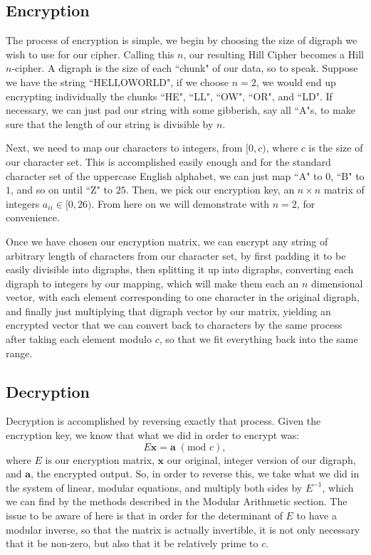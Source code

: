 \documentclass{article}
\begin{document}
\subsection{Encryption}
The process of encryption is simple, we begin by choosing the size of digraph we wish to use for our cipher. Calling this $n$, our resulting Hill Cipher becomes a Hill $n$-cipher. A digraph is the size of each ``chunk" of our data, so to speak. Suppose we have the string ``HELLOWORLD", if we choose $n = 2$, we would end up encrypting individually the chunks ``HE", ``LL", ``OW", ``OR", and ``LD". If necessary, we can just pad our string with some gibberish, say all ``A"s, to make sure that the length of our string is divisible by $n$. \medskip

\noindent Next, we need to map our characters to integers, from $[0, c)$, where $c$ is the size of our character set. This is accomplished easily enough and for the standard character set of the uppercase English alphabet, we can just map ``A" to $0$, ``B" to $1$, and so on until ``Z" to $25$. Then, we pick our encryption key, an $n \times n$ matrix of integers $a_{ii} \in [0, 26)$. From here on we will demonstrate with $n = 2$, for convenience. \medskip

\noindent Once we have chosen our encryption matrix, we can encrypt any string of arbitrary length of characters from our character set, by first padding it to be easily divisible into digraphs, then splitting it up into digraphs, converting each digraph to integers by our mapping, which will make them each an $n$ dimensional vector, with each element corresponding to one character in the original digraph, and finally just multiplying that digraph vector by our matrix, yielding an encrypted vector that we can convert back to characters by the same process after taking each element modulo $c$, so that we fit everything back into the same range.

\subsection{Decryption}
Decryption is accomplished by reversing exactly that process. Given the encryption key, we know that what we did in order to encrypt was:
\[
    E\mathbf{x} = \mathbf{a} \; (\text{mod } c),
\]
where $E$ is our encryption matrix, $\mathbf{x}$ our original, integer version of our digraph, and $\mathbf{a}$, the encrypted output. So, in order to reverse this, we take what we did in the system of linear, modular equations, and multiply both sides by $E^{-1}$, which we can find by the methods described in the Modular Arithmetic section. The issue to be aware of here is that in order for the determinant of $E$ to have a modular inverse, so that the matrix is actually invertible, it is not only necessary that it be non-zero, but also that it be relatively prime to $c$. \medskip
\end{document}
